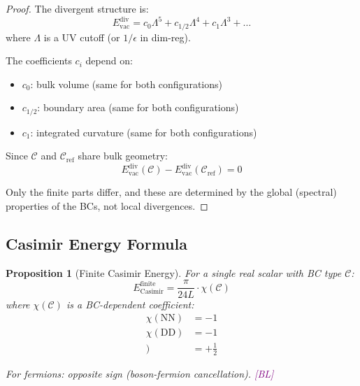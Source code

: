 \documentclass[11pt,a4paper]{article}
\newtheorem{proposition}[theorem]{Proposition}
\newcommand{\tagBL}{\textcolor{purple}{[BL]}}
\begin{document}
\begin{proof}
The divergent structure is:
\begin{equation}
\label{eq:div-structure}
E_{\text{vac}}^{\text{div}} = c_0 \Lambda^5 + c_{1/2} \Lambda^4 + c_1 \Lambda^3 + \ldots
\end{equation}
where $\Lambda$ is a UV cutoff (or $1/\epsilon$ in dim-reg).

The coefficients $c_i$ depend on:
\begin{itemize}
    \item $c_0$: bulk volume (same for both configurations)
    \item $c_{1/2}$: boundary area (same for both configurations)
    \item $c_1$: integrated curvature (same for both configurations)
\end{itemize}

Since $\mathcal{C}$ and $\mathcal{C}_{\text{ref}}$ share bulk geometry:
\begin{equation}
\label{eq:div-cancel}
E_{\text{vac}}^{\text{div}}(\mathcal{C}) - E_{\text{vac}}^{\text{div}}(\mathcal{C}_{\text{ref}}) = 0
\end{equation}

Only the finite parts differ, and these are determined by the global (spectral) properties
of the BCs, not local divergences.
\end{proof}

\subsection{Casimir Energy Formula}

\begin{proposition}[Finite Casimir Energy]
\label{prop:casimir}
For a single real scalar with BC type $\mathcal{C}$:
\begin{equation}
\label{eq:casimir-finite}
E_{\text{Casimir}}^{\text{finite}} = \frac{\pi}{24 L} \cdot \chi(\mathcal{C})
\end{equation}
where $\chi(\mathcal{C})$ is a BC-dependent coefficient:
\begin{align}
\label{eq:chi-NN}
\chi(\text{NN}) &= -1 \\
\label{eq:chi-DD}
\chi(\text{DD}) &= -1 \\
\label{eq:chi-ND}) &= +\frac{1}{2}
\end{align}

For fermions: opposite sign (boson-fermion cancellation). \tagBL
\end{proposition}
\end{document}
